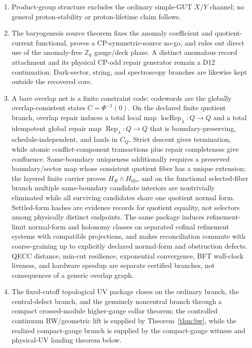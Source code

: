 \documentclass[11pt]{article}
\begin{document}
\begin{enumerate}[leftmargin=2em]
\item Product-group structure excludes the ordinary simple-GUT \(X/Y\) channel; no general proton-stability or proton-lifetime claim follows.
\item The baryogenesis source theorem fixes the anomaly coefficient and quotient-current functional, proves a CP-symmetric-source no-go, and rules out direct use of the anomaly-free \(\mathbb Z_6\) gauge/deck phase. A distinct anomalous record attachment and its physical CP-odd repair generator remain a D12 continuation. Dark-sector, string, and spectroscopy branches are likewise kept outside the recovered core.
\item A bare overlap net is a finite constraint code: codewords are the globally overlap-consistent states \(C=\Phi^{-1}(0)\). On the declared finite quotient branch, overlap repair induces a total local map \(\operatorname{locRep}_\lambda:Q\to Q\) and a total idempotent global repair map \(\operatorname{Rep}_\lambda:Q\to Q\) that is boundary-preserving, schedule-independent, and lands in \(C_Q\). Strict descent gives termination, while atomic conflict-component transactions plus repair completeness give confluence. Same-boundary uniqueness additionally requires a preserved boundary/sector map whose consistent quotient fiber has a unique extension; the layered finite carrier proves \(H_B\wedge H_{\mathrm{fib}}\), and on the functional selected-fiber branch multiple same-boundary candidate interiors are nontrivially eliminated while all surviving candidates share one quotient normal form. Settled-form hashes are evidence records for quotient equality, not selectors among physically distinct endpoints. The same package induces refinement-limit normal-form and holonomy classes on separated cofinal refinement systems with compatible projections, and makes reconciliation commute with coarse-graining up to explicitly declared normal-form and obstruction defects. QECC distance, min-cut resilience, exponential convergence, BFT wall-clock liveness, and hardware speedup are separate certified branches, not consequences of a generic overlap graph.
\item The fixed-cutoff topological UV package closes on the ordinary branch, the central-defect branch, and the genuinely noncentral branch through a compact crossed-module higher-gauge collar theorem; the controlled continuum BW/geometric lift is supplied by Theorem~\ref{thm:bw}, while the realized compact-gauge branch is supplied by the compact-gauge witness and physical-UV landing theorem below.
\end{enumerate}
\end{document}
